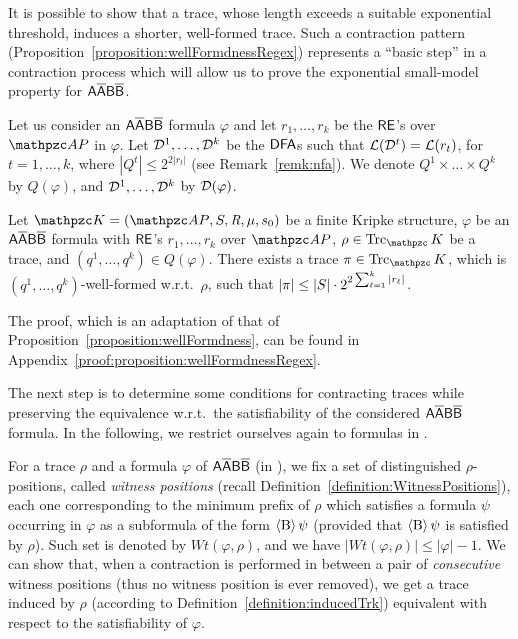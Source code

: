 It is possible to show that a trace, whose length exceeds a suitable
exponential threshold, induces a shorter, well-formed trace. 
Such a contraction pattern (Proposition~\ref{proposition:wellFormdnessRegex})  represents a ``basic step'' in a contraction process which will allow us to prove the exponential small-model property for $\mathsf{A\overline{A}B\overline{B}}$.

Let us consider 
an $\mathsf{A\overline{A}B\overline{B}}$ formula $\varphi$ and let $r_1,\ldots ,r_k$ be the $\mathsf{RE}$'s over $\Prop$ in $\varphi$. Let 
 $\mathcal{D}^1,\ldots, \mathcal{D}^k$ be the $\text{\sffamily DFA}$s such that $\mathcal{L}(\mathcal{D}^t)=\mathcal{L}(r_t)$, for $t=1,\ldots, k$, where $|Q^t|\leq 2^{2|r_t|}$ (see Remark~\ref{remk:nfa}). We denote $Q^1\times \ldots \times Q^k$ by $Q(\varphi)$, and $\mathcal{D}^1,\ldots, \mathcal{D}^{k}$ by $\mathcal{D}(\varphi)$.

\begin{proposition}\label{proposition:wellFormdnessRegex} 
Let $\Ku=\KuDef$ be a finite Kripke structure, $\varphi$ be an $\mathsf{A\overline{A}B\overline{B}}$ formula  with $\mathsf{RE}$'s $r_1,\ldots ,r_k$ over $\Prop$, $\rho\in\Trk_\Ku$ be
a trace, and $(q^1,\ldots , q^k)\in Q(\varphi)$. There exists a trace $\pi\in\Trk_\Ku$, which is $(q^1,\ldots , q^k)$-well-formed w.r.t.\ $\rho$, such that $|\pi| \leq |S|\cdot 2^{2\sum^k_{\ell=1}|r_\ell|}$.
\end{proposition}
The proof, which is an adaptation of that of Proposition~\ref{proposition:wellFormdness}, can be found in Appendix~\ref{proof:proposition:wellFormdnessRegex}.

The next step is to determine some conditions for contracting traces while preserving the equivalence w.r.t.\ the satisfiability of the considered $\mathsf{A\overline{A}B\overline{B}}$ formula. 
 In the following, we restrict ourselves again to formulas in \nnf.

For a trace $\rho$ and a formula $\varphi$ of $\mathsf{A\overline{A}B\overline{B}}$ (in \nnf), we fix a set of distinguished $\rho$-positions, called \emph{witness positions} (recall Definition~\ref{definition:WitnessPositions}), each one corresponding to the minimum prefix of $\rho$ which satisfies a formula $\psi$ occurring in $\varphi$ as a subformula of the form $\operatorname{\langle B\rangle}\psi$ (provided that $\operatorname{\langle B\rangle}\psi$ is satisfied by $\rho$). Such set is denoted by $Wt(\varphi,\rho)$, and we have $|Wt(\varphi,\rho)|\leq |\varphi|-1$.
We can show that, when a contraction is performed
 in between a pair of \emph{consecutive} witness positions (thus no witness position is ever removed), we get a trace induced by $\rho$ (according to Definition~\ref{definition:inducedTrk}) equivalent with respect to the satisfiability of $\varphi$. 


